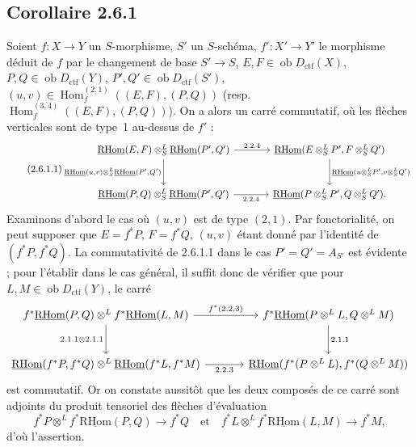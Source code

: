 \documentclass[11pt]{article}
\DeclareMathOperator{\Hom}{Hom}
\newcommand{\R}{\mathrm{R}}\newcommand{\RHomCore}{\mathrm{RHom}}
\newcommand{\ob}{\operatorname{ob}}
\providecommand{\RHom}{\RHomCore}
\providecommand{\uRHom}{\underline{\RHom}}
\providecommand{\ctf}{\mathrm{ctf}}
\providecommand{\RHom}{\RHomCore}
\providecommand{\Hom}{\operatorname{Hom}}
\providecommand{\ob}{\operatorname{ob}}
\providecommand{\RHom}{\R\mathcal{H}om}
\providecommand{\R}{\mathrm R}
\providecommand{\RHom}{\RHomCore}
\providecommand{\Hom}{\operatorname{Hom}}
\begin{document}
\subsection*{Corollaire 2.6.1}
Soient $f:X\to Y$ un $S$-morphisme, $S'$ un $S$-schéma, $f':X'\to Y'$ le morphisme déduit de $f$ par le changement de base $S'\to S$, $E,F\in\ob D_{\ctf}(X)$, $P,Q\in\ob D_{\ctf}(Y)$, $P',Q'\in\ob D_{\ctf}(S')$, $(u,v)\in\Hom_f^{(2,1)}((E,F),(P,Q))$ (resp. $\Hom_f^{(3,4)}((E,F),(P,Q))$). On a alors un carré commutatif, où les flèches verticales sont de type~1 au-dessus de $f'$ :
\begin{equation}\tag{2.6.1.1}
\begin{tikzcd}[column sep=large,row sep=large]
\uRHom(E,F)\otimes^L_S\uRHom(P',Q') \arrow[r,"2.2.4"] \arrow[d,"{\uRHom(u,v)\otimes^L_S\uRHom(P',Q')}"'] & \uRHom(E\otimes^L_SP',F\otimes^L_SQ') \arrow[d,"{\uRHom(u\otimes^L_SP',v\otimes^L_SQ')}"]\\
\uRHom(P,Q)\otimes^L_S\uRHom(P',Q') \arrow[r,"2.2.4"'] & \uRHom(P\otimes^L_SP',Q\otimes^L_SQ').
\end{tikzcd}
\end{equation}
Examinons d'abord le cas où $(u,v)$ est de type $(2,1)$. Par fonctorialité, on peut supposer que $E=f^{*}P$, $F=f^{*}Q$, $(u,v)$ étant donné par l'identité de $(f^{*}P,f^{*}Q)$. La commutativité de 2.6.1.1 dans le cas $P'=Q'=A_{S'}$ est évidente ; pour l'établir dans le cas général, il suffit donc de vérifier que pour $L,M\in\ob D_{\ctf}(Y)$, le carré
\[
\begin{tikzcd}[column sep=large,row sep=large]
f^{*}\uRHom(P,Q)\otimes^L f^{*}\uRHom(L,M) \arrow[r,"{f^*(2.2.3)}"] \arrow[d,"{2.1.1\otimes 2.1.1}"'] & f^{*}\uRHom(P\otimes^LL,Q\otimes^LM) \arrow[d,"2.1.1"]\\
\uRHom(f^{*}P,f^{*}Q)\otimes^L\uRHom(f^{*}L,f^{*}M) \arrow[r,"2.2.3"'] & \uRHom(f^{*}(P\otimes^LL),f^{*}(Q\otimes^LM))
\end{tikzcd}
\]
est commutatif. Or on constate aussitôt que les deux composés de ce carré sont adjoints du produit tensoriel des flèches d'évaluation
\[
f^{*}P\otimes^L f^{*}\uRHom(P,Q)\longrightarrow f^{*}Q
\quad\text{et}\quad
f^{*}L\otimes^L f^{*}\uRHom(L,M)\longrightarrow f^{*}M,
\]
d'où l'assertion.
\end{document}

